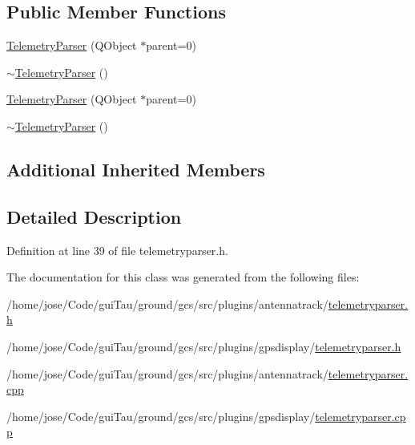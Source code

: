 \subsection*{Public Member Functions}
\begin{DoxyCompactItemize}
\item 
\hyperlink{group___antenna_track_gadget_plugin_ga0a989a67079a7e06f5034415c751b46c}{Telemetry\-Parser} (Q\-Object $\ast$parent=0)
\item 
\hyperlink{group___antenna_track_gadget_plugin_ga9a05a4fb6f18cdc568bc4e8f52534977}{$\sim$\-Telemetry\-Parser} ()
\item 
\hyperlink{group___g_p_s_gadget_plugin_ga0a989a67079a7e06f5034415c751b46c}{Telemetry\-Parser} (Q\-Object $\ast$parent=0)
\item 
\hyperlink{group___g_p_s_gadget_plugin_ga9a05a4fb6f18cdc568bc4e8f52534977}{$\sim$\-Telemetry\-Parser} ()
\end{DoxyCompactItemize}
\subsection*{Additional Inherited Members}


\subsection{Detailed Description}


Definition at line 39 of file telemetryparser.\-h.



The documentation for this class was generated from the following files\-:\begin{DoxyCompactItemize}
\item 
/home/jose/\-Code/gui\-Tau/ground/gcs/src/plugins/antennatrack/\hyperlink{antennatrack_2telemetryparser_8h}{telemetryparser.\-h}\item 
/home/jose/\-Code/gui\-Tau/ground/gcs/src/plugins/gpsdisplay/\hyperlink{gpsdisplay_2telemetryparser_8h}{telemetryparser.\-h}\item 
/home/jose/\-Code/gui\-Tau/ground/gcs/src/plugins/antennatrack/\hyperlink{antennatrack_2telemetryparser_8cpp}{telemetryparser.\-cpp}\item 
/home/jose/\-Code/gui\-Tau/ground/gcs/src/plugins/gpsdisplay/\hyperlink{gpsdisplay_2telemetryparser_8cpp}{telemetryparser.\-cpp}\end{DoxyCompactItemize}
